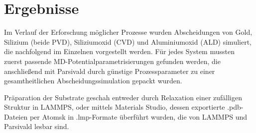 \chapter{Ergebnisse}

Im Verlauf der Erforschung möglicher Prozesse wurden Abscheidungen von Gold, Silizium (beide PVD), Siliziumoxid (CVD) und Aluminiumoxid (ALD) simuliert, die nachfolgend im Einzelnen vorgestellt werden.
Für jedes System mussten zuerst passende MD-Potential\-para\-metri\-sierungen gefunden werden, die anschließend mit Parsivald durch günstige Prozessparameter zu einer gesamtheitlichen Abscheidungssimulation gepackt wurden.

Präparation der Substrate geschah entweder durch Relaxation einer zufälligen Struktur in LAMMPS, oder mittels Materials Studio, dessen exportierte .pdb-Dateien per Atomsk in .lmp-Formate überführt wurden, die von LAMMPS und Parsivald lesbar sind.


\clearpage

\clearpage

\clearpage


